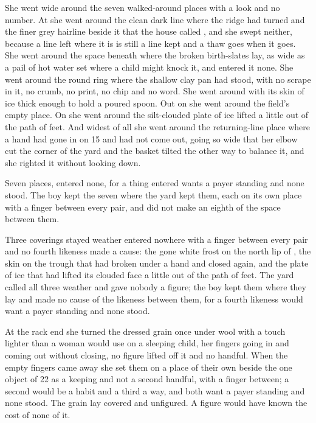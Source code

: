She went wide around the seven walked-around places with a look and no number. At  she went around the clean dark line where the ridge had turned and the finer grey hairline beside it that the house called , and she swept neither, because a line left where it is is still a line kept and a thaw goes when it goes. She went around the space beneath  where the broken birth-slates lay, as wide as a pail of hot water set where a child might knock it, and entered it none. She went around the round ring where the shallow clay pan had stood, with no scrape in it, no crumb, no print, no chip and no word. She went around  with its skin of ice thick enough to hold a poured spoon. Out on  she went around the field's empty place. On  she went around the silt-clouded plate of ice lifted a little out of the path of feet. And widest of all she went around the returning-line place where a hand had gone in on  15 and had not come out, going so wide that her elbow cut the corner of the yard and the basket tilted the other way to balance it, and she righted it without looking down.

Seven places, entered none, for a thing entered wants a payer standing and none stood. The boy kept the seven where the yard kept them, each on its own place with a finger between every pair, and did not make an eighth of the space between them.

\scenebreak

Three coverings stayed weather entered nowhere with a finger between every pair and no fourth likeness made a cause: the gone white frost on the north lip of , the skin on the trough that had broken under a hand and closed again, and the plate of ice that had lifted its clouded face a little out of the path of feet. The yard called all three weather and gave nobody a figure; the boy kept them where they lay and made no cause of the likeness between them, for a fourth likeness would want a payer standing and none stood.

At the rack end she turned the dressed grain once under wool with a touch lighter than a woman would use on a sleeping child, her fingers going in and coming out without closing, no figure lifted off it and no handful. When the empty fingers came away she set them on a place of their own beside the one object of  22 as a keeping and not a second handful, with a finger between; a second would be a habit and a third a way, and both want a payer standing and none stood. The grain lay covered and unfigured. A figure would have known the cost of none of it.

